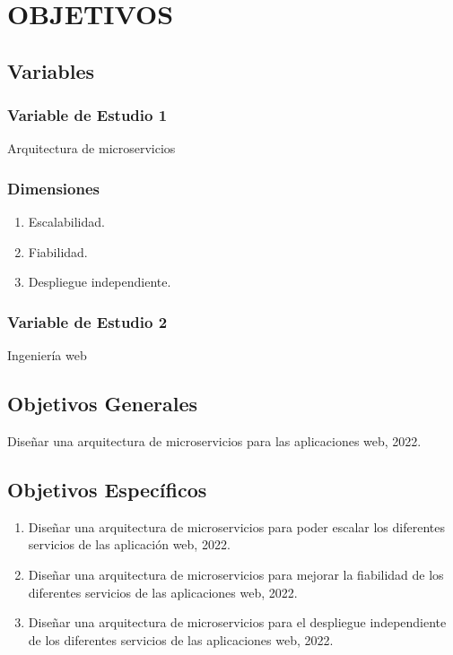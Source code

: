 \section{OBJETIVOS}

\subsection{Variables}

\subsubsection{Variable de Estudio 1}
Arquitectura de microservicios

\subsubsection{Dimensiones}
\begin{enumerate}
  \item Escalabilidad.
  \item Fiabilidad.
  \item Despliegue independiente.
\end{enumerate}


\subsubsection{Variable de Estudio 2}
Ingeniería web


\subsection{Objetivos Generales}

Diseñar una arquitectura de microservicios para las aplicaciones web, 2022.

\subsection{Objetivos Específicos}

\begin{enumerate}
  \item Diseñar una arquitectura de microservicios para poder escalar los diferentes servicios de las aplicación web, 2022.
  \item Diseñar una arquitectura de microservicios para mejorar la fiabilidad de los diferentes servicios de las aplicaciones web, 2022.
  \item Diseñar una arquitectura de microservicios para el despliegue independiente de los diferentes servicios de las aplicaciones web, 2022.
\end{enumerate}
